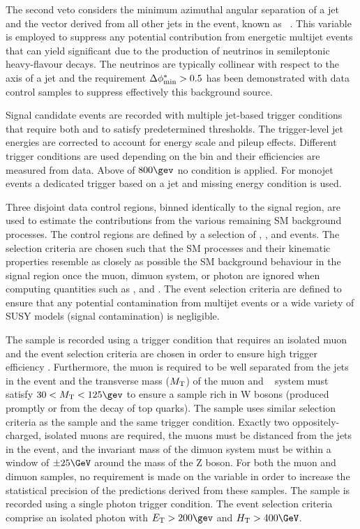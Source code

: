 The second veto considers the minimum azimuthal angular separation of
a jet and the \mht vector derived from all other jets in the event,
known as \dphi~\cite{RA1Paper}. This variable is employed to suppress
any potential contribution from energetic multijet events that can
yield significant \met due to the production of neutrinos in
semileptonic heavy-flavour decays. The neutrinos are typically
collinear with respect to the axis of a jet and the requirement $\Delta\phi^{*}_{\rm min}
> 0.5$ has been demonstrated with data control samples to suppress
effectively this background source.

Signal candidate events are recorded with multiple jet-based trigger
conditions that require both \scalht and \alphat to satisfy
predetermined thresholds. The trigger-level jet energies are corrected
to account for energy scale and pileup effects. Different trigger
conditions are used depending on the \scalht bin and their
efficiencies are measured from data. Above \scalht of $800\gev$ no 
\alphat condition is applied. For monojet events a dedicated trigger based on a jet and missing energy condition is used.

Three disjoint data control regions, binned identically to the signal
region, are used to estimate the contributions from the various
remaining SM background processes. The control regions are defined by
a selection of \mj, \mmj, and \gj events. The selection criteria are
chosen such that the SM processes and their kinematic properties
resemble as closely as possible the SM background behaviour in the
signal region once the muon, dimuon system, or photon are ignored when
computing quantities such as \scalht, \mht and \alphat. 
The event selection criteria are defined to ensure that any potential
contamination from multijet events or a wide variety of SUSY models
(\ie signal contamination) is negligible.

The \mj sample is recorded using a trigger condition that requires an
isolated muon and the event selection criteria are chosen in order to ensure 
high trigger efficiency . Furthermore, the
muon is required to be well separated from the jets in the event and
the transverse mass ($M_{\rm T}$) of the muon and
\met~\cite{CMS-PAS-PFT-09-001, CMS-PAS-PFT-10-001} system must satisfy
$30 < M_{\rm T} < 125\gev$ to ensure a sample rich in W bosons
(produced promptly or from the decay of top quarks). The \mmj sample
uses similar selection criteria as the \mj sample and the same trigger
condition. Exactly two
oppositely-charged, isolated muons are required, the muons must be
distanced from the jets in the event, and the invariant mass of the
dimuon system must be within a window of $\pm 25\GeV$ around the mass
of the Z boson. For both the muon and dimuon samples, no requirement
is made on the variable \alphat in order to increase the statistical
precision of the predictions derived from these samples.  The \gj
sample is recorded using a single photon trigger condition. The event
selection criteria comprise an isolated photon with $\Et > 200\gev$ and
$\scalht > 400\GeV$.

